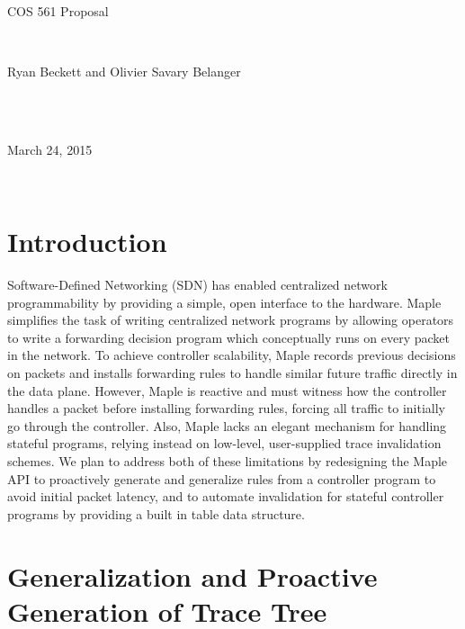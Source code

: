\documentclass[12pt]{article}
\begin{document}
\quad \\
\quad \\
\quad \\
\centerline{ \large{COS 561 Proposal}}
\vspace{1pt}\\
\centerline{Ryan Beckett and Olivier Savary Belanger} \\
\\
\centerline{March 24, 2015} \\



\section*{Introduction}

Software-Defined Networking (SDN) has enabled centralized network programmability by providing a simple, open interface to the hardware. Maple \cite{Maple} simplifies the task of writing centralized network programs by allowing operators to write a forwarding decision program which conceptually runs on every packet in the network. To achieve controller scalability, Maple records previous decisions on packets and installs forwarding rules to handle similar future traffic directly in the data plane. However, Maple is reactive and must witness how the controller handles a packet before installing forwarding rules, forcing all traffic to initially go through the controller. Also, Maple lacks an elegant mechanism for handling stateful programs, relying instead on low-level, user-supplied trace invalidation schemes. We plan to address both of these limitations by redesigning the Maple API to proactively generate and generalize rules from a controller program to avoid initial packet latency, and to automate invalidation for stateful controller programs by providing a built in table data structure.


\section*{Generalization and Proactive Generation of Trace Tree}

\end{document}
